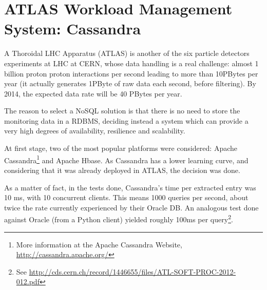
\section{ATLAS Workload Management System: Cassandra} %
\label{sec:atlas_workload_management_system_cassandra}

A Thoroidal LHC Apparatus (ATLAS) is another of the six particle detectors experiments at LHC at CERN, whose data handling is a real challenge: almost 1 billion proton proton interactions per second leading to more than 10PBytes per year (it actually generates 1PByte of raw data each second, before filtering). By 2014, the expected data rate will be 40 PBytes per year.


The reason to select a NoSQL solution is
that
there is no need to store the monitoring data in a RDBMS, deciding instead a system which can provide a very high degrees of availability, resilience and scalability.

At first stage, two of the most popular platforms were considered: Apache
Cassandra\footnote{More information at the Apache Cassandra Website, \url{http://cassandra.apache.org/}}
and Apache Hbase. As Cassandra has a lower learning curve, and considering that it was already deployed in ATLAS, the decision was done. %

As a matter of fact, in the tests done, Cassandra's time per extracted entry was 10 ms, with 10 concurrent clients. This means 1000 queries per second, about twice the rate currently experienced by their Oracle DB. An analogous test done against Oracle (from a Python client) yielded roughly 100ms per
query\footnote{See \url{http://cds.cern.ch/record/1446655/files/ATL-SOFT-PROC-2012-012.pdf}}.


